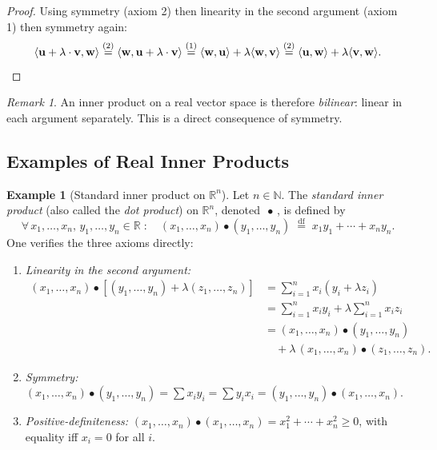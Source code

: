 \documentclass[11pt, a4paper, notitlepage]{report}
\theoremstyle{definition}
\newtheorem{example}[theorem]{Example}
\theoremstyle{remark}
\newtheorem{remark}[theorem]{Remark}
\begin{document}
\begin{proof}
Using symmetry (axiom 2) then linearity in the second argument (axiom 1) then symmetry again:
\[
  \langle\mathbf{u}+\lambda\cdot\mathbf{v},\mathbf{w}\rangle
  \overset{(2)}{=}
  \langle\mathbf{w},\mathbf{u}+\lambda\cdot\mathbf{v}\rangle
  \overset{(1)}{=}
  \langle\mathbf{w},\mathbf{u}\rangle + \lambda\langle\mathbf{w},\mathbf{v}\rangle
  \overset{(2)}{=}
  \langle\mathbf{u},\mathbf{w}\rangle + \lambda\langle\mathbf{v},\mathbf{w}\rangle. \qedhere
\]
\end{proof}

\begin{remark}
An inner product on a real vector space is therefore \emph{bilinear}: linear in each argument
separately. This is a direct consequence of symmetry.
\end{remark}

\subsection{Examples of Real Inner Products}
\label{subsec:real-ip-examples}

\begin{example}[Standard inner product on $\mathbb{R}^n$]
\label{ex:dot-product-Rn}
Let $n \in \mathbb{N}$. The \emph{standard inner product} (also called the
\emph{dot product}) on $\mathbb{R}^n$, denoted $\,\bullet\,$, is defined by
\[
  \forall\, x_1,\ldots,x_n,\,y_1,\ldots,y_n \in \mathbb{R}\;:\quad
  (x_1,\ldots,x_n)\bullet(y_1,\ldots,y_n) \;\stackrel{\mathrm{df}}{=}\; x_1 y_1 + \cdots + x_n y_n.
\]
One verifies the three axioms directly:
\begin{enumerate}
  \item \textit{Linearity in the second argument:}
        \begin{align*}
          (x_1,\ldots,x_n)\bullet[(y_1,\ldots,y_n)+\lambda(z_1,\ldots,z_n)]
          &= \sum_{i=1}^n x_i(y_i + \lambda z_i)\\
          &= \sum_{i=1}^n x_i y_i + \lambda\sum_{i=1}^n x_i z_i \\
          &= (x_1,\ldots,x_n)\bullet(y_1,\ldots,y_n) \\
          &\quad + \lambda\,(x_1,\ldots,x_n)\bullet(z_1,\ldots,z_n).
        \end{align*}
  \item \textit{Symmetry:}
        $\displaystyle(x_1,\ldots,x_n)\bullet(y_1,\ldots,y_n)
         = \sum x_i y_i = \sum y_i x_i
         = (y_1,\ldots,y_n)\bullet(x_1,\ldots,x_n)$.
  \item \textit{Positive-definiteness:}
        $(x_1,\ldots,x_n)\bullet(x_1,\ldots,x_n) = x_1^2+\cdots+x_n^2 \geq 0$,
        with equality iff $x_i = 0$ for all $i$.
\end{enumerate}
\end{example}
\end{document}
